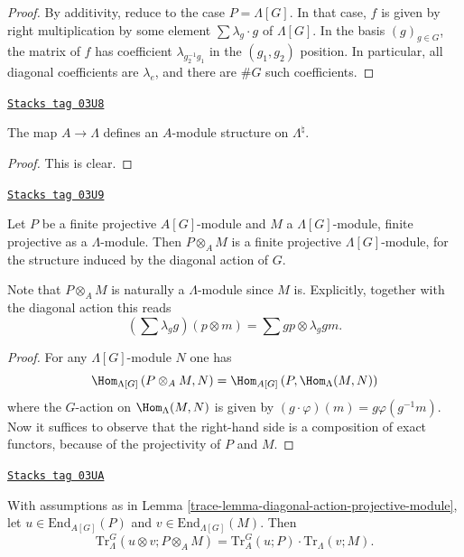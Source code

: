\begin{proof}
By additivity, reduce to the case $P = \Lambda[G]$.
In that case, $f$ is given by
right multiplication by some element $\sum\lambda_g\cdot g$ of $\Lambda[G]$. In
the basis $(g)_{g \in G}$, the matrix of $f$ has coefficient
$\lambda_{g_2^{-1}g_1}$ in the $(g_1, g_2)$ position. In particular, all
diagonal coefficients are $\lambda_e$, and there are $\# G$ such coefficients.
\end{proof}

\begin{lemma}
\label{trace-lemma-A-module-structure}
\href{https://stacks.math.columbia.edu/tag/03U8}{\texttt{Stacks tag 03U8}}

The map $A\to \Lambda$ defines an $A$-module structure on $\Lambda^\natural$.
\end{lemma}

\begin{proof}
This is clear.
\end{proof}

\begin{lemma}
\label{trace-lemma-diagonal-action-projective-module}
\href{https://stacks.math.columbia.edu/tag/03U9}{\texttt{Stacks tag 03U9}}

Let $P$ be a finite projective $A[G]$-module and $M$ a $\Lambda[G]$-module,
finite projective as a $\Lambda$-module. Then $P \otimes_A M$ is a finite
projective $\Lambda[G]$-module, for the structure induced by the diagonal
action of $G$.
\end{lemma}

Note that $P \otimes_A M$ is naturally a $\Lambda$-module since $M$ is.
Explicitly, together with the diagonal action this reads
$$
\left(\sum\lambda_g g\right)\left(p \otimes m\right)
=
\sum g p \otimes \lambda_g g m.
$$

\begin{proof}
For any $\Lambda[G]$-module $N$ one has
$$
\Hom_{\Lambda[G]}\left(P \otimes_A M, N\right)= \Hom_{A[G]}\left(P,
\Hom_{\Lambda}(M, N)\right)
$$
where the $G$-action on $\Hom_{\Lambda}(M, N)$ is given by $(g\cdot
\varphi)(m) = g \varphi (g^{-1} m) $. Now it suffices to observe that the
right-hand side is a composition of exact functors, because of the projectivity
of $P$ and $M$.
\end{proof}

\begin{lemma}
\label{trace-lemma-multiplicative-trace}
\href{https://stacks.math.columbia.edu/tag/03UA}{\texttt{Stacks tag 03UA}}

With assumptions as in
Lemma \ref{trace-lemma-diagonal-action-projective-module},
let
$u\in \text{End}_{A[G]}(P)$ and $v\in \text{End}_{\Lambda[G]}(M)$. Then
$$
\text{Tr}_\Lambda^G \left(u \otimes v; P \otimes_A M\right) = \text{Tr}_A^G(u;
P)\cdot \text{Tr}_\Lambda(v;M).
$$
\end{lemma}

